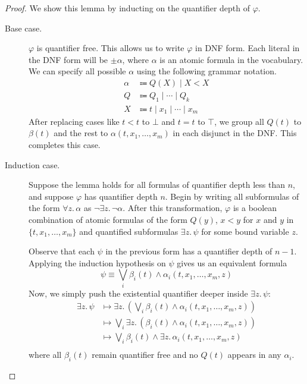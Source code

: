 \documentclass[a4paper,UKenglish,cleveref, autoref, thm-restate, numberwithinsect]{lipics-v2021}
\begin{document}
\begin{proof}
    We show this lemma by inducting on the quantifier depth of $\varphi$.
    \begin{description}
        \item[Base case.]
            $\varphi$ is quantifier free. This allows us to write $\varphi$ in DNF form. Each literal in the DNF form will be $\pm \alpha$, where $\alpha$ is an atomic formula in the vocabulary. We can specify all possible $\alpha$ using the following grammar notation.
            \begin{equation*}
                \begin{aligned}
                    \alpha &\Coloneqq Q(X) \mid X < X\\
                    Q &\Coloneqq Q_1 \mid \cdots \mid Q_k\\
                    X &\Coloneqq t \mid x_1 \mid \cdots \mid x_m
                \end{aligned}
            \end{equation*}
            After replacing cases like $t < t$ to $\bot$  and $t = t$ to $\top$, we group all $Q(t)$ to $\beta(t)$ and the rest to $\alpha(t, x_1, \ldots, x_m)$ in each disjunct in the DNF. This completes this case.

        \item[Induction case.] Suppose the lemma holds for all formulas of quantifier depth less than $n$, and suppose $\varphi$ has quantifier depth $n$. Begin by writing all subformulas of the form $\forall z.\, \alpha$ as $\lnot \exists z.\, \lnot \alpha$. After this transformation, $\varphi$ is a boolean combination of atomic formulas of the form $Q(y)$, $x < y$ for $x$ and $y$ in $\{t, x_1, \ldots, x_m\}$ and quantified subformulas $\exists z.\, \psi$ for some bound variable $z$.

        Observe that each $\psi$ in the previous form has a quantifier depth of $n-1$. Applying the induction hypothesis on $\psi$ gives us an equivalent formula
        \begin{equation*}
            \psi \equiv \bigvee_i \beta_i(t) \land \alpha_i(t, x_1, \ldots, x_m, z)
        \end{equation*}
        Now, we simply push the existential quantifier deeper inside $\exists z.\, \psi$:
        \begin{equation*}
            \begin{aligned}
                \exists z.\, \psi &\longmapsto \exists z.\, \left( \bigvee_i \beta_i(t) \land \alpha_i(t, x_1, \ldots, x_m, z) \right)\\
                &\longmapsto \bigvee_i \exists z.\, \left( \beta_i(t) \land \alpha_i(t, x_1, \ldots, x_m, z) \right)\\
                &\longmapsto \bigvee_i \beta_i(t) \land \exists z.\, \alpha_i(t, x_1, \ldots, x_m, z)\\
            \end{aligned}
        \end{equation*}
        where all $\beta_i(t)$ remain quantifier free and no $Q(t)$ appears in any $\alpha_i$.


\end{description}
\end{proof}
\end{document}
